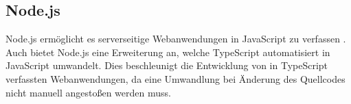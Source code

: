 \subsection{Node.js}
\label{sec:nodejs}

Node.js ermöglicht es serverseitige Webanwendungen in JavaScript zu verfassen \cite[S. 4]{Fedosejev2015}. Auch bietet Node.js eine Erweiterung an, welche TypeScript automatisiert in JavaScript umwandelt. Dies beschleunigt die Entwicklung von in TypeScript verfassten Webanwendungen, da eine Umwandlung bei Änderung des Quellcodes nicht manuell angestoßen werden muss.